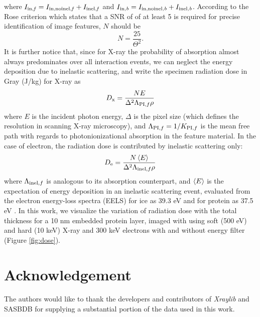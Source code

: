 \documentclass[]{article}
\newcommand\inel{\textup{\scriptsize{inel}}}
\newcommand\PI{\textup{\scriptsize{PI}}}
\newcommand\inelb{\textup{\scriptsize{inel,\textit b}}}
\newcommand\innoinelb{\textup{\scriptsize{in,noinel,\textit b}}}
\newcommand\inb{\textup{\scriptsize{in,\textit b}}}
\newcommand\inelf{\textup{\scriptsize{inel,\textit f}}}
\newcommand\innoinelf{\textup{\scriptsize{in,noinel,\textit f}}}
\newcommand\inff{\textup{\scriptsize{in,\textit f}}}
\begin{document}
where $I_{\inff} = I_{\innoinelf} + I_{\inelf}$ and $I_{\inb} = I_{\innoinelb} + I_{\inelb}$. According to the Rose criterion which states that a SNR of of at least 5 is required for precise identification of image features, $N$ should be
\begin{equation}
N = \frac{25}{\Theta^2}.
\end{equation}
It is further notice that, since for X-ray the probability of absorption almost always predominates over all interaction events, we can neglect the energy deposition due to inelastic scattering, and write the specimen radiation dose in Gray (J/kg) for X-ray as 
\begin{equation}
D_\mathrm{x} = \frac{NE}{\Delta^2 \Lambda_{\PI,f} \rho}
\end{equation}
where $E$ is the incident photon energy, $\Delta$ is the pixel size (which defines the resolution in scanning X-ray microscopy), and $\Lambda_{\PI,f} = 1/K_{\PI,f}$ is the mean free path with regards to photonionizational absorption in the feature material. In the case of electron, the radiation dose is contributed by inelastic scattering only:
\begin{equation}
D_\mathrm{e} = \frac{N\Braket{E}}{\Delta^2 \Lambda_{\inel,f} \rho}
\end{equation}
where $\Lambda_{\inel,f}$ is analogous to its absorption counterpart, and $\Braket{E}$ is the expectation of energy deposition in an inelastic scattering event, evaluated from the electron energy-loss spectra (EELS) for ice as 39.3 eV and for protein as 37.5 eV \cite{Isaacson:1975wr}. In this work, we visualize the variation of radiation dose with the total thickness for a 10 nm embedded protein layer, imaged with using soft (500 eV) and hard (10 keV) X-ray and 300 keV electrons with and without energy filter (Figure \ref{fig:dose}). 




\section{Acknowledgement}
\paragraph{} The authors would like to thank the developers and contributors of \textit{Xraylib} and SASBDB for supplying a substantial portion of the data used in this work. 

{}

\end{document}
